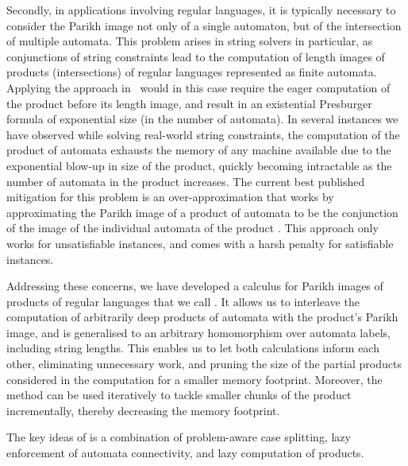 \iffalse
Later improvements have produced a construction taking at
most linear time to produce~\cite{muscholl-linear}. However, the
resulting existentially quantified clauses are costly to eliminate as
the number of variables increases, in practice making many real-world
problems intractable.
\fi

Secondly, in applications involving regular languages, it is typically
necessary to consider the Parikh image not only of a single automaton,
but of the intersection of multiple automata. This problem arises in
string solvers in particular, as conjunctions of string constraints
lead to the computation of length images of products (intersections)
of regular languages represented as finite automata. Applying the
approach in~\cite{generate-parikh-image} would in this case require
the eager computation of the product before its length image, and
result in an existential Presburger formula of exponential size (in
the number of automata). In several instances we have observed while
solving real-world string constraints, the computation of the product
of automata exhausts the memory of any machine available due to the
exponential blow-up in size of the product, quickly becoming
intractable as the number of automata in the product increases. The
current best published mitigation for this problem is an
over-approximation that works by approximating the Parikh image of a
product of automata to be the conjunction of the image of the
individual automata of the product \cite{approximate-parikh}. This
approach only works for unsatisfiable instances, and comes with a
harsh penalty for satisfiable instances.

Addressing these concerns, we have developed a calculus for Parikh images of
products of regular languages that we call \Calculus{}. It allows us to
interleave the computation of arbitrarily deep products of automata with the
product's Parikh image, and is generalised to an arbitrary homomorphism over
automata labels, including string lengths. This enables us to let both
calculations inform each other, eliminating unnecessary work, and pruning the
size of the partial products considered in the computation for a smaller memory
footprint. Moreover, the method can be used iteratively to tackle smaller chunks
of the product incrementally, thereby decreasing the memory footprint.

The key ideas of \Calculus{} is a combination of problem-aware case splitting,
lazy enforcement of automata connectivity, and lazy computation of products.

